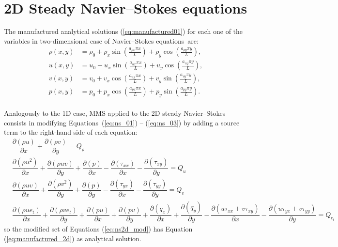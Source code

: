 \documentclass[10pt]{article}
\newcommand{\Diff}[2] {\dfrac{\partial( #1)}{\partial #2}}
\begin{document}
 \section{2D Steady Navier--Stokes equations}
The manufactured analytical solutions (\ref{eq:manufactured01}) for each one of the variables in two-dimensional case of Navier--Stokes equations~are:
\begin{equation}
\begin{split}
\label{eq:manufactured_2d}
\rho\left(x,y\right) &=  \rho_{0}+ \rho_{x} \sin\left(\frac{a_{ \rho x} \pi x}{L}\right)+ \rho_{y} \cos\left(\frac{a_{ \rho y} \pi y}{L}\right),\\
u\left(x,y\right) &= u_{0}+u_{x} \sin\left(\frac{a_{u x} \pi x}{L}\right)+u_{y} \cos\left(\frac{a_{u y} \pi y}{L}\right),\\
v\left(x,y\right) &= v_{0}+v_{x} \cos\left(\frac{a_{v x} \pi x}{L}\right)+v_{y} \sin\left(\frac{a_{v y} \pi y}{L}\right),\\
p\left(x,y\right) &= p_{0}+p_{x} \cos\left(\frac{a_{p x} \pi x}{L}\right)+p_{y} \sin\left(\frac{a_{p y} \pi y}{L}\right).\\
\end{split}
\end{equation}


Analogously to the 1D case, MMS applied to the 2D steady Navier--Stokes consists in modifying Equations~(\ref{eq:ns_01}) -- (\ref{eq:ns_03}) by adding a source term to the right-hand side of each equation:
\begin{equation}
\begin{split}
\label{eq:ns2d_mod}
& \Diff{\rho u}{x}+\Diff{\rho v}{y} = Q_\rho\\
& \Diff{\rho u^2 }{x}+\Diff{\rho uv}{y} +\Diff{p}{x}-\Diff{\tau_{xx}}{x}-\Diff{\tau_{xy}}{y}= Q_u\\
& \Diff{\rho uv}{x}+\Diff{\rho v^2}{y} +\Diff{p}{y}-\Diff{\tau_{yx}}{x}-\Diff{\tau_{yy}}{y}= Q_v\\
& \Diff{\rho ue_t }{x}+\Diff{\rho ve_t}{y}+\Diff{pu}{x} +\Diff{pv}{y}+\Diff{q_x}{x}+\Diff{q_y}{y}-\Diff{u\tau_{xx}+v\tau_{xy}}{x}-\Diff{u\tau_{yx}+v\tau_{yy}}{y}= Q_{e_t}
\end{split}
\end{equation}
so the modified set of Equations (\ref{eq:ns2d_mod}) has Equation (\ref{eq:manufactured_2d}) as analytical solution.
\end{document}

